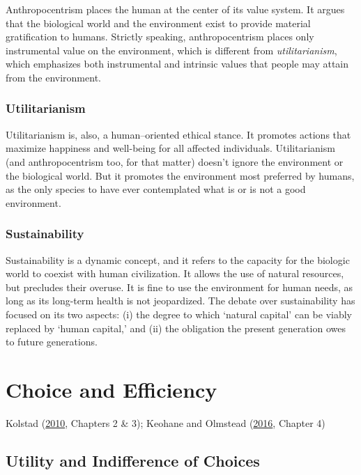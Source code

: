 \documentclass[
]{book}
\begin{document}
Anthropocentrism places the human at the center of its value system. It argues that the biological world and the environment exist to provide material gratification to humans. Strictly speaking, anthropocentrism places only instrumental value on the environment, which is different from \emph{utilitarianism}, which emphasizes both instrumental and intrinsic values that people may attain from the environment.

\hypertarget{utilitarianism}{%
\subsection{Utilitarianism}\label{utilitarianism}}

Utilitarianism is, also, a human--oriented ethical stance. It promotes actions that maximize happiness and well-being for all affected individuals. Utilitarianism (and anthropocentrism too, for that matter) doesn't ignore the environment or the biological world. But it promotes the environment most preferred by humans, as the only species to have ever contemplated what is or is not a good environment.

\hypertarget{sustainability}{%
\subsection{Sustainability}\label{sustainability}}

Sustainability is a dynamic concept, and it refers to the capacity for the biologic world to coexist with human civilization. It allows the use of natural resources, but precludes their overuse. It is fine to use the environment for human needs, as long as its long-term health is not jeopardized. The debate over sustainability has focused on its two aspects: (i) the degree to which `natural capital' can be viably replaced by `human capital,' and (ii) the obligation the present generation owes to future generations.

\hypertarget{choice-and-efficiency}{%
\chapter{Choice and Efficiency}\label{choice-and-efficiency}}

Kolstad (\protect\hyperlink{ref-kolstad2010}{2010}, Chapters 2 \& 3); Keohane and Olmstead (\protect\hyperlink{ref-keohane2016}{2016}, Chapter 4)

\hypertarget{utility-and-indifference-of-choices}{%
\section{Utility and Indifference of Choices}\label{utility-and-indifference-of-choices}}
\end{document}
